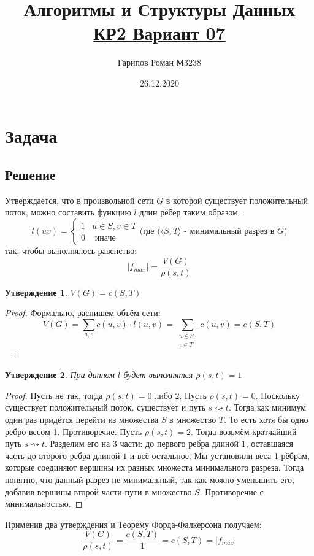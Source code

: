 \documentclass{article}
\title{Алгоритмы и Структуры Данных \Large{\href{https://nerc.itmo.ru/teaching/algo/year2019/quiz-06/81205cec60bda1c11261160292e6152d.pdf}{\textcolor{myblue}{КР2 Вариант 07}}}}
\date{26.12.2020}
\author{Гарипов Роман М3238}
\theoremstyle{plain}
\newtheorem*{theorem*}{Утверждение}
\theoremstyle{remark}
\theoremstyle{definition}
\begin{document}
  \maketitle
\section*{Задача }
\subsection*{Решение}
    Утверждается, что в произвольной сети $G$ в которой существует положительный поток, можно составить функцию $l$ длин рёбер таким образом :\begin{equation*}
        l(uv) = 
         \begin{cases}
           1 &\text{$u \in S, v \in T$}\\
           0 &\text{ иначе }
         \end{cases}
        \mbox{(где ($\langle S, T \rangle$ - минимальный разрез в $G$)}
    \end{equation*}
    так, чтобы выполнялось равенство:
    \begin{equation*}
        |f_{max}| = \frac{V(G)}{\rho(s, t)}
    \end{equation*}
    \begin{theorem*}
    $V(G) = c(S, T)$
    \end{theorem*}
    \begin{proof}
        Формально, распишем объём сети: 
        \begin{equation*}
        V(G) = \sum_{u, v} c(u, v)\cdot l(u, v) = \sum_{\substack{u \in S, \\ v \in T}} c(u, v) = c(S, T)
    \end{equation*}
    \end{proof}
    \begin{theorem*}
         При данном $l$ будет выполнятся   $ \rho(s, t) = 1$
    \end{theorem*}
    \begin{proof}
        Пусть не так, тогда $\rho(s, t) = 0 \mbox{ либо } 2$.
        \newline
        Пусть $\rho(s, t) = 0$. Поскольку существует положительный поток, существует и путь $s \rightsquigarrow t$. Тогда как минимум один раз придётся перейти из множества $S$ в множество $T$. То есть хотя бы одно ребро весом 1. Противоречие.
        \newline
        Пусть $\rho(s, t) = 2$. Тогда возьмём кратчайший путь $s \rightsquigarrow t$. Разделим его на 3 части: до первого ребра длиной $1$, оставшаяся часть до второго ребра длиной $1$ и всё остальное.
        Мы установили веса 1 рёбрам, которые соединяют вершины их разных множеста минимального разреза. Тогда понятно, что данный разрез не минимальный, так как можно уменьшить его, добавив вершины второй части пути в множество $S$. Противоречие с минимальностью.
    \end{proof}
    Применив два утверждения и Теорему Форда-Фалкерсона получаем:
    \begin{equation*}
        \frac{V(G)}{\rho(s, t)} = \frac{c(S, T)}{1} = c(S, T) = |f_{max}|
    \end{equation*}
\end{document}
